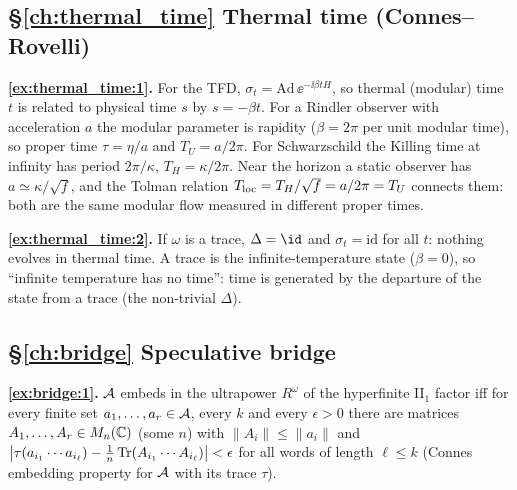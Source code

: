 {\subsection*{\S\ref{ch:thermal_time} Thermal time (Connes--Rovelli)}
\textbf{\ref{ex:thermal_time:1}.} For the TFD, $\sigma_t=\mathrm{Ad}\,\ee^{-\ii\beta tH}$, so thermal (modular) time $t$ is related to physical time $s$ by $s=-\beta t$. For a Rindler observer with acceleration $a$ the modular parameter is rapidity ($\beta=2\pi$ per unit modular time), so proper time $\tau=\eta/a$ and $T_U=a/2\pi$. For Schwarzschild the Killing time at infinity has period $2\pi/\kappa$, $T_H=\kappa/2\pi$. Near the horizon a static observer has $a\simeq\kappa/\sqrt f$, and the Tolman relation $T_{\rm loc}=T_H/\sqrt f=a/2\pi=T_U$ connects them: both are the same modular flow measured in different proper times.\par
\textbf{\ref{ex:thermal_time:2}.} If $\omega$ is a trace, $\Delta=\id$ and $\sigma_t=\mathrm{id}$ for all $t$: nothing evolves in thermal time. A trace is the infinite-temperature state ($\beta=0$), so ``infinite temperature has no time'': time is generated by the departure of the state from a trace (the non-trivial $\Delta$).\par

\subsection*{\S\ref{ch:bridge} Speculative bridge}
\textbf{\ref{ex:bridge:1}.} $\mathcal{A}$ embeds in the ultrapower $R^\omega$ of the hyperfinite II$_1$ factor iff for every finite set $a_1,\dots,a_r\in\mathcal{A}$, every $k$ and every $\epsilon>0$ there are matrices $A_1,\dots,A_r\in M_n(\mathbb{C})$ (some $n$) with $\|A_i\|\le\|a_i\|$ and $\big|\tau(a_{i_1}\cdots a_{i_\ell})-\frac1n\operatorname{Tr}(A_{i_1}\cdots A_{i_\ell})\big|<\epsilon$ for all words of length $\ell\le k$ (Connes embedding property for $\mathcal{A}$ with its trace $\tau$).\par

}
